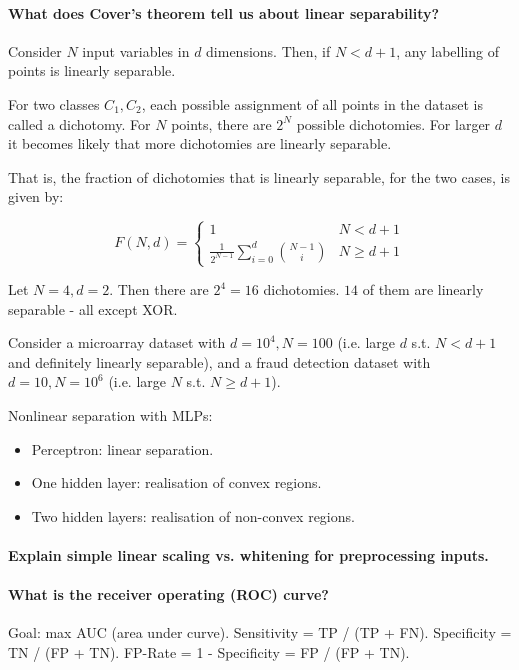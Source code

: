 \paragraph{What does Cover's theorem tell us about linear separability?}

Consider $N$ input variables in $d$ dimensions.
Then, if $N < d + 1$, any labelling of points is linearly separable.

For two classes $C_1, C_2$, each possible assignment of all points in the dataset is called a dichotomy.
For $N$ points, there are $2^N$ possible dichotomies.
For larger $d$ it becomes likely that more dichotomies are linearly separable.

That is, the fraction of dichotomies that is linearly separable, for the two cases, is given by:

$$
F(N, d) = \begin{cases}
    1 & N < d + 1 \\
    \frac{1}{2^{N-1}} \sum_{i=0}^d{\binom{N-1}{i}} & N \geq d + 1
\end{cases}
$$

Let $N = 4, d = 2$.
Then there are $2^4 = 16$ dichotomies.
$14$ of them are linearly separable - all except XOR.

Consider a microarray dataset with $d = 10^4, N = 100$ (i.e. large $d$ s.t. $N < d + 1$ and definitely linearly separable),
and a fraud detection dataset with $d = 10, N = 10^6$ (i.e. large $N$ s.t. $N \geq d + 1$).

Nonlinear separation with MLPs:

\begin{itemize}
    \item Perceptron: linear separation.
    \item One hidden layer: realisation of convex regions.
    \item Two hidden layers: realisation of non-convex regions.
\end{itemize}

\paragraph{Explain simple linear scaling vs. whitening for preprocessing inputs.}

\paragraph{What is the receiver operating (ROC) curve?}

Goal: max AUC (area under curve).
Sensitivity = TP / (TP + FN).
Specificity = TN / (FP + TN).
FP-Rate = 1 - Specificity = FP / (FP + TN).


